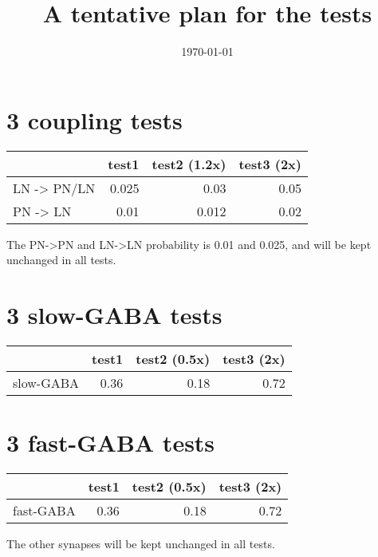 \documentclass[11pt]{article}
\date{\today}
\title{A tentative plan for the tests}
\begin{document}
\maketitle
\tableofcontents



\section{3 coupling tests}
\label{sec:org8793e13}
\begin{center}
\begin{tabular}{lrrr}
\hline
 & test1 & test2 (1.2x) & test3 (2x)\\
\hline
LN -> PN/LN & 0.025 & 0.03 & 0.05\\
PN -> LN & 0.01 & 0.012 & 0.02\\
\hline
\end{tabular}
\end{center}

The PN->PN and LN->LN probability is 0.01 and 0.025, and will be kept unchanged in all tests.


\section{3 slow-GABA tests}
\label{sec:org38d7ce8}
\begin{center}
\begin{tabular}{lrrr}
\hline
 & test1 & test2 (0.5x) & test3 (2x)\\
\hline
slow-GABA & 0.36 & 0.18 & 0.72\\
\hline
\end{tabular}
\end{center}

\section{3 fast-GABA tests}
\label{sec:orgad3990a}
\begin{center}
\begin{tabular}{lrrr}
\hline
 & test1 & test2 (0.5x) & test3 (2x)\\
\hline
fast-GABA & 0.36 & 0.18 & 0.72\\
\hline
\end{tabular}
\end{center}

The other synapses will be kept unchanged in all tests.
\end{document}
